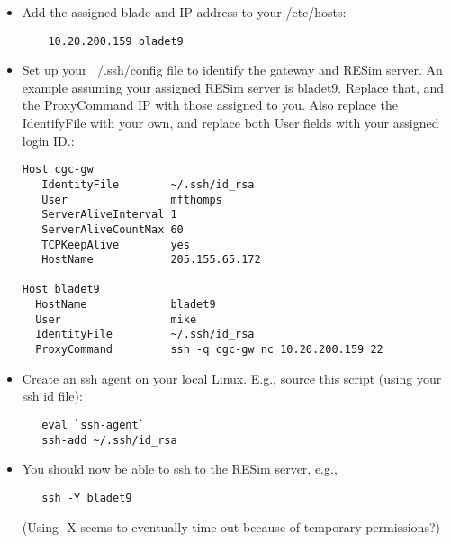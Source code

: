 \documentclass[titlepage]{article}
\begin{document}
\begin{itemize}

\item Add the assigned blade and IP address to your /etc/hosts:
\begin{verbatim}
    10.20.200.159 bladet9
\end{verbatim}

\item Set up your ~/.ssh/config file to identify the gateway and RESim server.  An example
assuming your assigned RESim server is bladet9.  Replace that, and the ProxyCommand IP with 
those assigned to you.  Also replace the IdentifyFile with your own,
and replace both User fields with your assigned login ID.:

\begin{verbatim}
Host cgc-gw
   IdentityFile        ~/.ssh/id_rsa
   User                mfthomps
   ServerAliveInterval 1
   ServerAliveCountMax 60
   TCPKeepAlive        yes
   HostName            205.155.65.172

Host bladet9
  HostName             bladet9
  User                 mike
  IdentityFile         ~/.ssh/id_rsa
  ProxyCommand         ssh -q cgc-gw nc 10.20.200.159 22
\end{verbatim}

\item Create an ssh agent on your local Linux.  E.g., source this script (using
your ssh id file):

\begin{verbatim}
   eval `ssh-agent`
   ssh-add ~/.ssh/id_rsa
\end{verbatim}

\item You should now be able to ssh to the RESim server, e.g., 
\begin{verbatim}
   ssh -Y bladet9
\end{verbatim}
(Using -X seems to eventually time out because of temporary permissions?)

\end{itemize}
\end{document}
